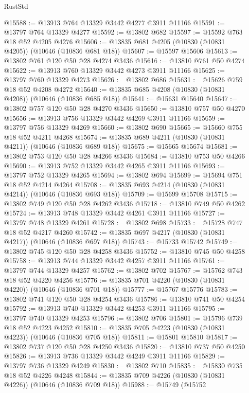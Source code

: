 \begin{lexlean}{RustStd}
\begin{coremodule}
@15588 := @13913 @764 @13329 @3442 @4277 @3911 @11166
@15591 := @13797 @764 @13329 @4277
@15592 := @13802 @682
@15597 := @15592 @763 @18 @52 @4205 @4276
@15606 := @13835 @681 @4205 (@10830 (@10831 @4205)) (@10646 (@10836 @681 @18))
@15607 := @15597 @15606
@15613 := @13802 @761 @120 @50 @28 @4274 @3436
@15616 := @13810 @761 @50 @4274
@15622 := @13913 @760 @13329 @3442 @4273 @3911 @11166
@15625 := @13797 @760 @13329 @4273
@15626 := @13802 @686
@15631 := @15626 @759 @18 @52 @4208 @4272
@15640 := @13835 @685 @4208 (@10830 (@10831 @4208)) (@10646 (@10836 @685 @18))
@15641 := @15631 @15640
@15647 := @13802 @757 @120 @50 @28 @4270 @3436
@15650 := @13810 @757 @50 @4270
@15656 := @13913 @756 @13329 @3442 @4269 @3911 @11166
@15659 := @13797 @756 @13329 @4269
@15660 := @13802 @690
@15665 := @15660 @755 @18 @52 @4211 @4268
@15674 := @13835 @689 @4211 (@10830 (@10831 @4211)) (@10646 (@10836 @689 @18))
@15675 := @15665 @15674
@15681 := @13802 @753 @120 @50 @28 @4266 @3436
@15684 := @13810 @753 @50 @4266
@15690 := @13913 @752 @13329 @3442 @4265 @3911 @11166
@15693 := @13797 @752 @13329 @4265
@15694 := @13802 @694
@15699 := @15694 @751 @18 @52 @4214 @4264
@15708 := @13835 @693 @4214 (@10830 (@10831 @4214)) (@10646 (@10836 @693 @18))
@15709 := @15699 @15708
@15715 := @13802 @749 @120 @50 @28 @4262 @3436
@15718 := @13810 @749 @50 @4262
@15724 := @13913 @748 @13329 @3442 @4261 @3911 @11166
@15727 := @13797 @748 @13329 @4261
@15728 := @13802 @698
@15733 := @15728 @747 @18 @52 @4217 @4260
@15742 := @13835 @697 @4217 (@10830 (@10831 @4217)) (@10646 (@10836 @697 @18))
@15743 := @15733 @15742
@15749 := @13802 @745 @120 @50 @28 @4258 @3436
@15752 := @13810 @745 @50 @4258
@15758 := @13913 @744 @13329 @3442 @4257 @3911 @11166
@15761 := @13797 @744 @13329 @4257
@15762 := @13802 @702
@15767 := @15762 @743 @18 @52 @4220 @4256
@15776 := @13835 @701 @4220 (@10830 (@10831 @4220)) (@10646 (@10836 @701 @18))
@15777 := @15767 @15776
@15783 := @13802 @741 @120 @50 @28 @4254 @3436
@15786 := @13810 @741 @50 @4254
@15792 := @13913 @740 @13329 @3442 @4253 @3911 @11166
@15795 := @13797 @740 @13329 @4253
@15796 := @13802 @706
@15801 := @15796 @739 @18 @52 @4223 @4252
@15810 := @13835 @705 @4223 (@10830 (@10831 @4223)) (@10646 (@10836 @705 @18))
@15811 := @15801 @15810
@15817 := @13802 @737 @120 @50 @28 @4250 @3436
@15820 := @13810 @737 @50 @4250
@15826 := @13913 @736 @13329 @3442 @4249 @3911 @11166
@15829 := @13797 @736 @13329 @4249
@15830 := @13802 @710
@15835 := @15830 @735 @18 @52 @4226 @4248
@15844 := @13835 @709 @4226 (@10830 (@10831 @4226)) (@10646 (@10836 @709 @18))
@15988 := @15749
    (@15752

\end{coremodule}
\end{lexlean}
